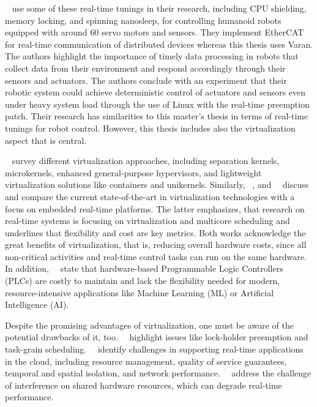 \documentclass[MMR,Master,english]{twbook}
\begin{document}
\bigskip \noindent \citeauthor{yoonRealTimePerformanceAnalysis}~\cite{yoonRealTimePerformanceAnalysis} use some of these real-time tunings in their research, including CPU shielding, memory locking, and spinning nanosleep, for controlling humanoid robots equipped with around 60 servo motors and sensors. They implement EtherCAT for real-time communication of distributed devices whereas this thesis uses Varan. The authors highlight the importance of timely data processing in robots that collect data from their environment and respond accordingly through their sensors and actuators. The authors conclude with an experiment that their robotic system could achieve deterministic control of actuators and sensors even under heavy system load through the use of Linux with the real-time preemption patch. Their research has similarities to this master's thesis in terms of real-time tunings for robot control. However, this thesis includes also the virtualization aspect that is central.

\bigskip \noindent \citeauthor{cinqueVirtualizingMixedCriticalitySystems2022}~\cite{cinqueVirtualizingMixedCriticalitySystems2022} survey different virtualization approaches, including separation kernels, microkernels, enhanced general-purpose hypervisors, and lightweight virtualization solutions like containers and unikernels. Similarly, \citeauthor{sandstromVirtualizationTechnologiesEmbedded2013}~\cite{sandstromVirtualizationTechnologiesEmbedded2013}, and~\citeauthor{taccariEmbeddedRealTimeVirtualization2014}~\cite{taccariEmbeddedRealTimeVirtualization2014} discuss and compare the current state-of-the-art in virtualization technologies with a focus on embedded real-time platforms. The latter emphasizes, that research on real-time systems is focusing on virtualization and multicore scheduling and underlines that flexibility and cost are key metrics. Both works acknowledge the great benefits of virtualization, that is, reducing overall hardware costs, since all non-critical activities and real-time control tasks can run on the same hardware. In addition,~\citeauthor{javierperezHowRealTime2022}~\cite{javierperezHowRealTime2022} state that hardware-based Programmable Logic Controllers (PLCs) are costly to maintain and lack the flexibility needed for modern, resource-intensive applications like Machine Learning (ML) or Artificial Intelligence (AI).

\bigskip \noindent Despite the promising advantages of virtualization, one must be aware of the potential drawbacks of it, too.~\citeauthor{guStateoftheArtSurveyRealTime2012}~\cite{guStateoftheArtSurveyRealTime2012} highlight issues like lock-holder preemption and task-grain scheduling.~\citeauthor{garcia-vallsChallengesRealtimeVirtualization2014}~\cite{garcia-vallsChallengesRealtimeVirtualization2014} identify challenges in supporting real-time applications in the cloud, including resource management, quality of service guarantees, temporal and spatial isolation, and network performance.~\citeauthor{scordinoRealTimeVirtualizationIndustrial2020}~\cite{scordinoRealTimeVirtualizationIndustrial2020} address the challenge of interference on shared hardware resources, which can degrade real-time performance.
\end{document}

